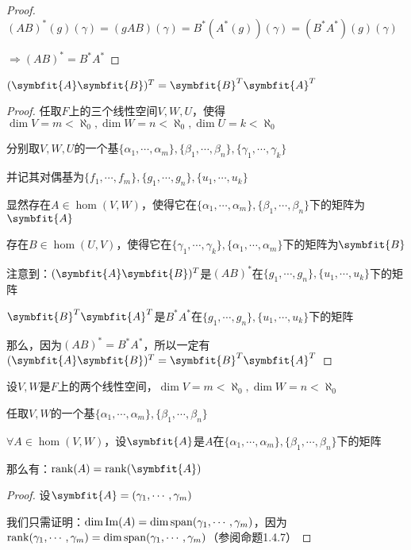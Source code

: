 \documentclass[12pt, a4paper, oneside, UTF8]{ctexbook}
\begin{document}
\begin{para}{0}
\begin{proof}
						$(AB)^*(g)(\gamma )=(gAB)(\gamma )=B^*(A^*(g))(\gamma )=(B^*A^*)(g)(\gamma )$

						$\Rightarrow (AB)^*=B^*A^*$
					\end{proof}
					\begin{proposition}
						$(\symbfit{A}\symbfit{B})^T = \symbfit{B}^T\symbfit{A}^T$
					\end{proposition}
					\begin{proof}
						任取$F$上的三个线性空间$V,W,U$，使得$\dim V = m < \aleph_0,\dim W = n < \aleph_0,\dim U = k < \aleph_0$

						分别取$V,W,U$的一个基$\{\alpha_1,\cdots,\alpha_m\},\{\beta_1,\cdots,\beta_n\},\{\gamma_1,\cdots,\gamma_k\}$

						并记其对偶基为$\{f_1,\cdots,f_m\},\{g_1,\cdots,g_n\},\{u_1,\cdots,u_k\}$

						显然存在$A \in \hom(V,W)$，使得它在$\{\alpha_1,\cdots,\alpha_m\},\{\beta_1,\cdots,\beta_n\}$下的矩阵为$\symbfit{A}$
						
						存在$B \in \hom(U,V)$，使得它在$\{\gamma_1,\cdots,\gamma_k\},\{\alpha_1,\cdots,\alpha_m\}$下的矩阵为$\symbfit{B}$

						注意到：$(\symbfit{A}\symbfit{B})^T$是$(AB)^*$在$\{g_1,\cdots,g_n\},\{u_1,\cdots,u_k\}$下的矩阵

						$\symbfit{B}^T\symbfit{A}^T$是$B^*A^*$在$\{g_1,\cdots,g_n\},\{u_1,\cdots,u_k\}$下的矩阵

						那么，因为$(AB)^*=B^*A^*$，所以一定有$(\symbfit{A}\symbfit{B})^T = \symbfit{B}^T\symbfit{A}^T$
					\end{proof}
				\point{}
					\begin{proposition}
						设$V,W$是$F$上的两个线性空间，$\dim V = m < \aleph_0,\dim W = n < \aleph_0$

						任取$V,W$的一个基$\{\alpha_1,\cdots,\alpha_m\},\{\beta_1,\cdots,\beta_n\}$
						
						$\forall A \in \hom(V,W)$，设$\symbfit{A}$是$A$在$\{\alpha_1,\cdots,\alpha_m\},\{\beta_1,\cdots,\beta_n\}$下的矩阵

						那么有：$\rank(A)=\rank(\symbfit{A})$
					\end{proposition}
					\begin{proof}
						设$\symbfit{A}=(\gamma_1,\cdots,\gamma _m)$

						我们只需证明：$\dim \operatorname{Im}(A)=\dim \operatorname{span}(\gamma_1,\cdots,\gamma _m)$，因为$\operatorname{rank}(\gamma_1,\cdots,\gamma _m)=\dim \operatorname{span}(\gamma_1,\cdots,\gamma _m)$（参阅命题1.4.7）


\end{proof}
\end{para}
\end{document}
